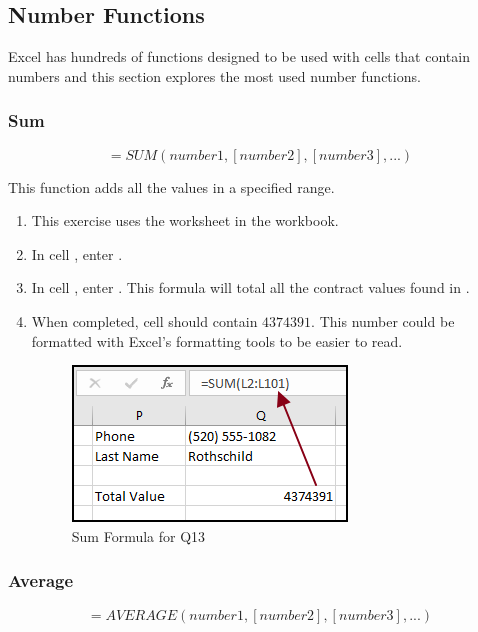 \subsection{Number Functions}

Excel has hundreds of functions designed to be used with cells that contain numbers and this section explores the most used number functions.

\subsubsection{Sum}

\[ =SUM(number1, [number2], [number3], ...) \]

This function adds all the values in a specified range. 

\begin{enumerate}
	\item This exercise uses the  worksheet in the  workbook.
	\item In cell , enter .
	\item In cell , enter . This formula will total all the contract values found in .
	\item When completed, cell  should contain $ 4374391 $. This number could be formatted with Excel's formatting tools to be easier to read.

	\begin{figure}[H]
		\centering
		\includegraphics[width=\maxwidth{.75\linewidth}]{gfx/ch09_fig38}
		\caption{Sum Formula for Q13}
		\label{09:fig38}
	\end{figure}
	
\end{enumerate}

\subsubsection{Average}

\[ =AVERAGE(number1, [number2], [number3], ...) \]

